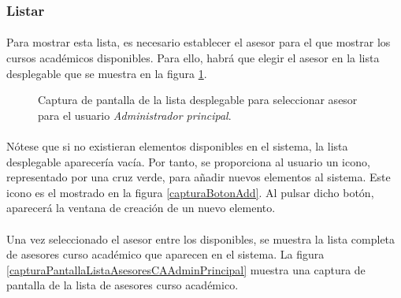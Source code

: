 \subsubsection{Listar}

  \paragraph{}Para mostrar esta lista, es necesario establecer el asesor para
  el que mostrar los cursos académicos disponibles. Para ello, habrá que elegir
  el asesor en la lista desplegable que se muestra en la figura
  \ref{capturaPantallaSelectAsesor}.

  \begin{figure}[!ht]
    \begin{center}
      \caption{Captura de pantalla de la lista desplegable para seleccionar asesor para el usuario \textit{Administrador principal}.}
      \label{capturaPantallaSelectAsesor}
    \end{center}
  \end{figure}

  \paragraph{}Nótese que si no existieran elementos disponibles en el sistema,
  la lista desplegable aparecería vacía. Por tanto, se proporciona al usuario
  un icono, representado por una cruz verde, para añadir nuevos elementos al
  sistema. Este icono es el mostrado en la figura \ref{capturaBotonAdd}. Al
  pulsar dicho botón, aparecerá la ventana de creación de un nuevo elemento.

  \paragraph{}Una vez seleccionado el asesor entre los disponibles, se muestra
  la lista completa de asesores curso académico que aparecen en el sistema. La
  figura \ref{capturaPantallaListaAsesoresCAAdminPrincipal} muestra una captura
  de pantalla de la lista de asesores curso académico.

